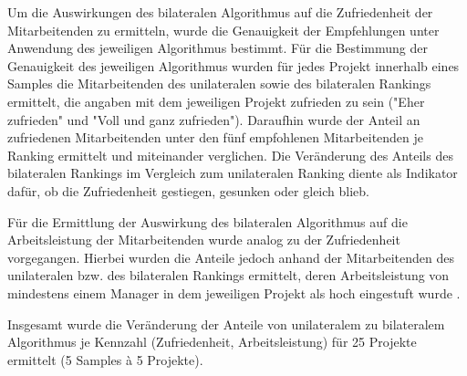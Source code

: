 Um die Auswirkungen des bilateralen Algorithmus auf die Zufriedenheit der Mitarbeitenden zu ermitteln, wurde die Genauigkeit der Empfehlungen unter Anwendung des jeweiligen Algorithmus bestimmt.
Für die Bestimmung der Genauigkeit des jeweiligen Algorithmus wurden für jedes Projekt innerhalb eines Samples die Mitarbeitenden des unilateralen sowie des bilateralen Rankings ermittelt, die angaben mit dem jeweiligen Projekt zufrieden zu sein ("Eher zufrieden" und "Voll und ganz zufrieden").
Daraufhin wurde der Anteil an zufriedenen Mitarbeitenden unter den fünf empfohlenen Mitarbeitenden je Ranking ermittelt und miteinander verglichen.
Die Veränderung des Anteils des bilateralen Rankings im Vergleich zum unilateralen Ranking diente als Indikator dafür, ob die Zufriedenheit gestiegen, gesunken oder gleich blieb.

Für die Ermittlung der Auswirkung des bilateralen Algorithmus auf die Arbeitsleistung der Mitarbeitenden wurde analog zu der Zufriedenheit vorgegangen.
Hierbei wurden die Anteile jedoch anhand der Mitarbeitenden des unilateralen bzw. des bilateralen Rankings ermittelt, deren Arbeitsleistung von mindestens einem Manager in dem jeweiligen Projekt als hoch eingestuft wurde .

Insgesamt wurde die Veränderung der Anteile von unilateralem zu bilateralem Algorithmus je Kennzahl (Zufriedenheit, Arbeitsleistung) für 25 Projekte ermittelt (5 Samples \`{a} 5 Projekte).


